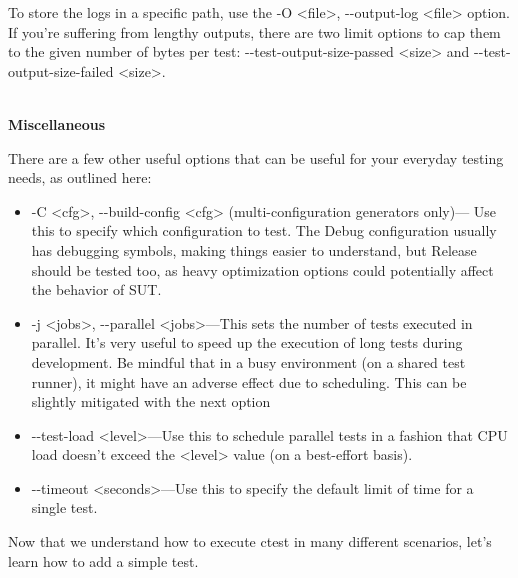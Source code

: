 To store the logs in a specific path, use the -O <file>, -{}-output-log <file> option. If you're suffering from lengthy outputs, there are two limit options to cap them to the given number of bytes per test: -{}-test-output-size-passed <size> and -{}-test-output-size-failed <size>.

\hspace*{\fill} \\ %
\noindent
\textbf{Miscellaneous}

There are a few other useful options that can be useful for your everyday testing needs, as outlined here:

\begin{itemize}
\item 
-C <cfg>, -{}-build-config <cfg> (multi-configuration generators only)— Use this to specify which configuration to test. The Debug configuration usually has debugging symbols, making things easier to understand, but Release should be tested too, as heavy optimization options could potentially affect the behavior of SUT.

\item 
-j <jobs>, -{}-parallel <jobs>—This sets the number of tests executed in parallel. It's very useful to speed up the execution of long tests during development. Be mindful that in a busy environment (on a shared test runner), it might have an adverse effect due to scheduling. This can be slightly mitigated with the next option

\item 
-{}-test-load <level>—Use this to schedule parallel tests in a fashion that CPU load doesn't exceed the <level> value (on a best-effort basis).

\item 
-{}-timeout <seconds>—Use this to specify the default limit of time for a single test.
\end{itemize}

Now that we understand how to execute ctest in many different scenarios, let's learn how to add a simple test.


























